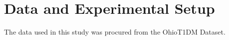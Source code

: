 
\section{Data and Experimental Setup}

The data used in this study was procured from the OhioT1DM Dataset. 















